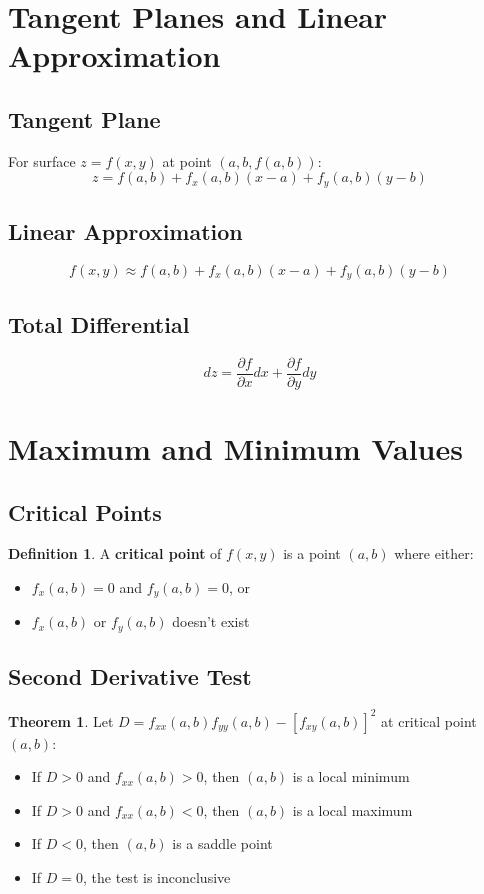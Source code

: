 \documentclass[11pt]{article}
\theoremstyle{definition}
\newtheorem{definition}{Definition}[section]
\newtheorem{theorem}{Theorem}[section]
\begin{document}
\section{Tangent Planes and Linear Approximation}

\subsection{Tangent Plane}
For surface $z = f(x,y)$ at point $(a,b,f(a,b))$:
$$z = f(a,b) + f_x(a,b)(x-a) + f_y(a,b)(y-b)$$

\subsection{Linear Approximation}
$$f(x,y) \approx f(a,b) + f_x(a,b)(x-a) + f_y(a,b)(y-b)$$

\subsection{Total Differential}
$$dz = \frac{\partial f}{\partial x} dx + \frac{\partial f}{\partial y} dy$$

\section{Maximum and Minimum Values}

\subsection{Critical Points}
\begin{definition}
A \textbf{critical point} of $f(x,y)$ is a point $(a,b)$ where either:
\begin{itemize}
    \item $f_x(a,b) = 0$ and $f_y(a,b) = 0$, or
    \item $f_x(a,b)$ or $f_y(a,b)$ doesn't exist
\end{itemize}
\end{definition}

\subsection{Second Derivative Test}
\begin{theorem}
Let $D = f_{xx}(a,b)f_{yy}(a,b) - [f_{xy}(a,b)]^2$ at critical point $(a,b)$:
\begin{itemize}
    \item If $D > 0$ and $f_{xx}(a,b) > 0$, then $(a,b)$ is a local minimum
    \item If $D > 0$ and $f_{xx}(a,b) < 0$, then $(a,b)$ is a local maximum
    \item If $D < 0$, then $(a,b)$ is a saddle point
    \item If $D = 0$, the test is inconclusive
\end{itemize}
\end{theorem}
\end{document}
